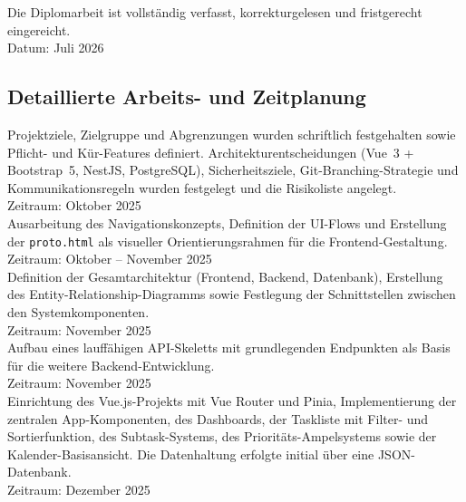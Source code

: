 \label{Ms:Abgabe}
Die Diplomarbeit ist vollständig verfasst, korrekturgelesen und fristgerecht eingereicht.\\
Datum: Juli 2026\\
 
 
\subsection{Detaillierte Arbeits- und Zeitplanung}
 
Projektziele, Zielgruppe und Abgrenzungen wurden schriftlich festgehalten sowie Pflicht- und Kür-Features definiert. Architekturentscheidungen (Vue~3 + Bootstrap~5, NestJS, PostgreSQL), Sicherheitsziele, Git-Branching-Strategie und Kommunikationsregeln wurden festgelegt und die Risikoliste angelegt.\\
Zeitraum: Oktober 2025\\
 
Ausarbeitung des Navigationskonzepts, Definition der UI-Flows und Erstellung der \texttt{proto.html} als visueller Orientierungsrahmen für die Frontend-Gestaltung.\\
Zeitraum: Oktober -- November 2025\\
 
Definition der Gesamtarchitektur (Frontend, Backend, Datenbank), Erstellung des Entity-Relationship-Diagramms sowie Festlegung der Schnittstellen zwischen den Systemkomponenten.\\
Zeitraum: November 2025\\
 
Aufbau eines lauffähigen API-Skeletts mit grundlegenden Endpunkten als Basis für die weitere Backend-Entwicklung.\\
Zeitraum: November 2025\\
 
Einrichtung des Vue.js-Projekts mit Vue Router und Pinia, Implementierung der zentralen App-Komponenten, des Dashboards, der Taskliste mit Filter- und Sortierfunktion, des Subtask-Systems, des Prioritäts-Ampelsystems sowie der Kalender-Basisansicht. Die Datenhaltung erfolgte initial über eine JSON-Datenbank.\\
Zeitraum: Dezember 2025\\
 
